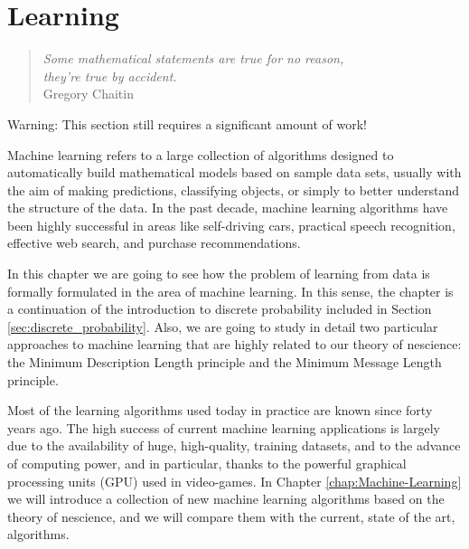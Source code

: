 %
%


\chapter{Learning}
\label{ch:Learning}

\begin{quote}
\begin{flushright}
\emph{Some mathematical statements are true for no reason,\\
they're true by accident.}\\
Gregory Chaitin
\end{flushright}
\end{quote}
\bigskip

{\color{red} Warning: This section still requires a significant amount of work!}

Machine learning refers to a large collection of algorithms designed to automatically build mathematical models based on sample data sets, usually with the aim of making predictions, classifying objects, or simply to better understand the structure of the data. In the past decade, machine learning algorithms have been highly successful in areas like self-driving cars, practical speech recognition, effective web search, and purchase recommendations.

In this chapter we are going to see how the problem of learning from data is formally formulated in the area of machine learning. In this sense, the chapter is a continuation of the introduction to discrete probability included in Section \ref{sec:discrete_probability}. Also, we are going to study in detail two particular approaches to machine learning that are highly related to our theory of nescience: the Minimum Description Length principle and the Minimum Message Length principle.

Most of the learning algorithms used today in practice are known since forty years ago. The high success of current machine learning applications is largely due to the availability of huge, high-quality, training datasets, and to the advance of computing power, and in particular, thanks to the powerful graphical processing units (GPU) used in video-games. In Chapter \ref{chap:Machine-Learning} we will introduce a collection of new machine learning algorithms based on the theory of nescience, and we will compare them with the current, state of the art, algorithms.

